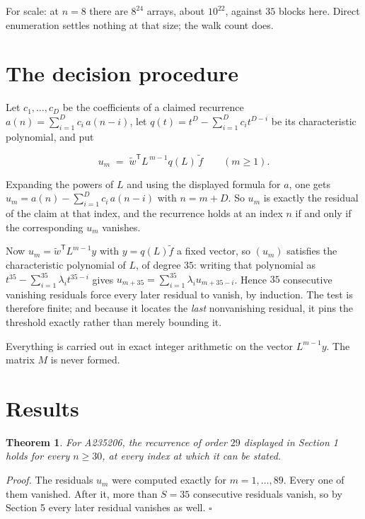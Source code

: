 \documentclass[11pt]{article}
\newtheorem{theorem}{Theorem}
\theoremstyle{definition}
\begin{document}
For scale: at $n = 8$ there are $8^{24}$ arrays, about $10^{22}$, against $35$ blocks here. Direct enumeration settles nothing at that size; the walk count does.

\section{The decision procedure}

Let $c_1,\dots,c_D$ be the coefficients of a claimed recurrence $a(n) = \sum_{i=1}^{D} c_i\,a(n-i)$, let $q(t) = t^{D} - \sum_{i=1}^{D} c_i t^{D-i}$ be its characteristic polynomial, and put

\[u_m \;=\; \tilde w^{\mathsf T} L^{\,m-1} q(L)\,\tilde f \qquad (m \ge 1).\]

Expanding the powers of $L$ and using the displayed formula for $a$, one gets $u_m = a(n) - \sum_{i=1}^{D} c_i\,a(n-i)$ with $n = m + D$. So $u_m$ is exactly the residual of the claim at that index, and the recurrence holds at an index $n$ if and only if the corresponding $u_m$ vanishes.

Now $u_m = \tilde w^{\mathsf T} L^{m-1} y$ with $y = q(L)\tilde f$ a fixed vector, so $(u_m)$ satisfies the characteristic polynomial of $L$, of degree $35$: writing that polynomial as $t^{35} - \sum_{i=1}^{35} \lambda_i t^{35-i}$ gives $u_{m+35} = \sum_{i=1}^{35} \lambda_i u_{m+35-i}$. Hence $35$ consecutive vanishing residuals force every later residual to vanish, by induction. The test is therefore finite; and because it locates the {\itshape last} nonvanishing residual, it pins the threshold exactly rather than merely bounding it.

Everything is carried out in exact integer arithmetic on the vector $L^{m-1}y$. The matrix $M$ is never formed.

\section{Results}

\begin{theorem} For A235206, the recurrence of order $29$ displayed in Section 1 holds for every $n \ge 30$, at every index at which it can be stated.\end{theorem}

{\itshape Proof.} The residuals $u_m$ were computed exactly for $m = 1,\dots,89$. Every one of them vanished. After it, more than $S = 35$ consecutive residuals vanish, so by Section 5 every later residual vanishes as well. $\square$
\end{document}
